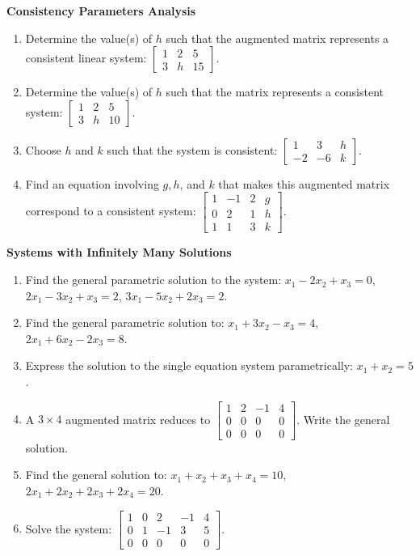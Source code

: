 \documentclass[11pt]{article}
\begin{document}
\textbf{Consistency Parameters Analysis}
\begin{enumerate}[label=\textbf{1.1.\arabic*}, resume]
    \item Determine the value(s) of $h$ such that the augmented matrix represents a consistent linear system: $\left[\begin{array}{cc|c} 1 & 2 & 5 \\ 3 & h & 15 \end{array}\right]$.
    \item Determine the value(s) of $h$ such that the matrix represents a consistent system: $\left[\begin{array}{cc|c} 1 & 2 & 5 \\ 3 & h & 10 \end{array}\right]$.
    \item Choose $h$ and $k$ such that the system is consistent: $\left[\begin{array}{cc|c} 1 & 3 & h \\ -2 & -6 & k \end{array}\right]$.
    \item Find an equation involving $g, h$, and $k$ that makes this augmented matrix correspond to a consistent system: $\left[\begin{array}{ccc|c} 1 & -1 & 2 & g \\ 0 & 2 & 1 & h \\ 1 & 1 & 3 & k \end{array}\right]$.
\end{enumerate}

\textbf{Systems with Infinitely Many Solutions}
\begin{enumerate}[label=\textbf{1.1.\arabic*}, resume]
    \item Find the general parametric solution to the system:
    $x_1 - 2x_2 + x_3 = 0$, 
    $2x_1 - 3x_2 + x_3 = 2$, 
    $3x_1 - 5x_2 + 2x_3 = 2$.
    \item Find the general parametric solution to: $x_1 + 3x_2 - x_3 = 4$, $2x_1 + 6x_2 - 2x_3 = 8$.
    \item Express the solution to the single equation system parametrically: $x_1 + x_2 = 5$.
    \item A $3 \times 4$ augmented matrix reduces to $\left[\begin{array}{ccc|c} 1 & 2 & -1 & 4 \\ 0 & 0 & 0 & 0 \\ 0 & 0 & 0 & 0 \end{array}\right]$. Write the general solution.
    \item Find the general solution to: $x_1 + x_2 + x_3 + x_4 = 10$, $2x_1 + 2x_2 + 2x_3 + 2x_4 = 20$.
    \item Solve the system: $\left[\begin{array}{cccc|c} 1 & 0 & 2 & -1 & 4 \\ 0 & 1 & -1 & 3 & 5 \\ 0 & 0 & 0 & 0 & 0 \end{array}\right]$.
\end{enumerate}
\end{document}
